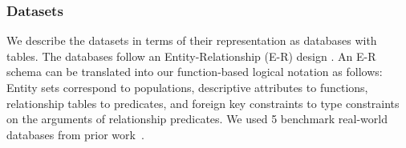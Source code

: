 \documentclass[runningheads,a4paper]{llncs}
\begin{document}
\subsubsection{Datasets}

We describe the datasets in terms of their representation as databases with tables. The databases follow an Entity-Relationship (E-R) design \cite{Ullman1982}. An E-R schema can be translated into our function-based logical notation as follows: Entity sets correspond to populations, descriptive attributes to functions, relationship tables to predicates, and foreign key constraints to type constraints on the arguments of relationship predicates.
%
We used %
5 benchmark real-world databases from prior work~\cite{Schulte2012}. 


\end{document}
